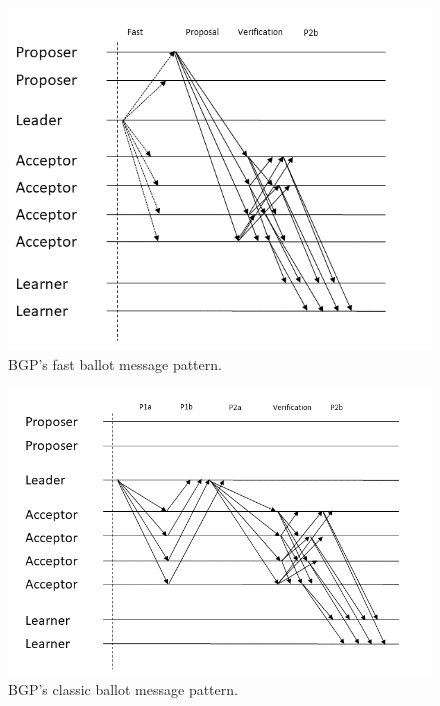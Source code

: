 \documentclass[algorithms,article,accept,moreauthors,pdftex,10pt,a4paper]{Definitions/mdpi}
\begin{document}
\begin{figure}[H]
\centering
\includegraphics[width=.6\textwidth]{Figures/bgp_fast}
\caption{{BGP's} fast ballot message pattern.} %
\label{bgp_fast}
\end{figure}
\unskip
\begin{figure}
\centering
\includegraphics[width=.6\textwidth]{Figures/bgp_classic}
\caption{{BGP's} classic ballot message pattern.}%
\label{bgp_classic}
\end{figure}
\unskip
\end{document}
